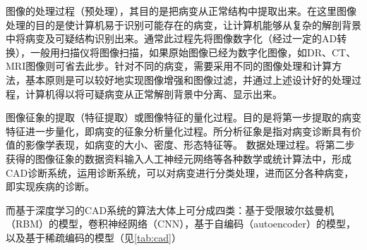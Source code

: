 图像的处理过程（预处理），其目的是把病变从正常结构中提取出来。在这里图像处理的目的是使计算机易于识别可能存在的病变，让计算机能够从复杂的解剖背景中将病变及可疑结构识别出来。通常此过程先将图像数字化（经过一定的AD转换），一般用扫描仪将图像扫描，如果原始图像已经为数字化图像，如DR、CT、MRI图像则可省去此步。针对不同的病变，需要采用不同的图像处理和计算方法，基本原则是可以较好地实现图像增强和图像过滤，并通过上述设计好的处理过程，计算机得以将可疑病变从正常解剖背景中分离、显示出来。

图像征象的提取（特征提取）或图像特征的量化过程。目的是将第一步提取的病变特征进一步量化，即病变的征象分析量化过程。所分析征象是指对病变诊断具有价值的影像学表现，如病变的大小、密度、形态特征等。
数据处理过程。将第二步获得的图像征象的数据资料输入人工神经元网络等各种数学或统计算法中，形成CAD诊断系统，运用诊断系统，可以对病变进行分类处理，进而区分各种病变，即实现疾病的诊断。

而基于深度学习的CAD系统的算法大体上可分成四类：基于受限玻尔兹曼机（RBM）的模型，卷积神经网络（CNN），基于自编码（autoencoder）的模型，以及基于稀疏编码的模型（见\ref{tab:cad}）\cite{4陈诗慧2017基于深度学习和医学图像的癌症计算机辅助诊断研究进展}

